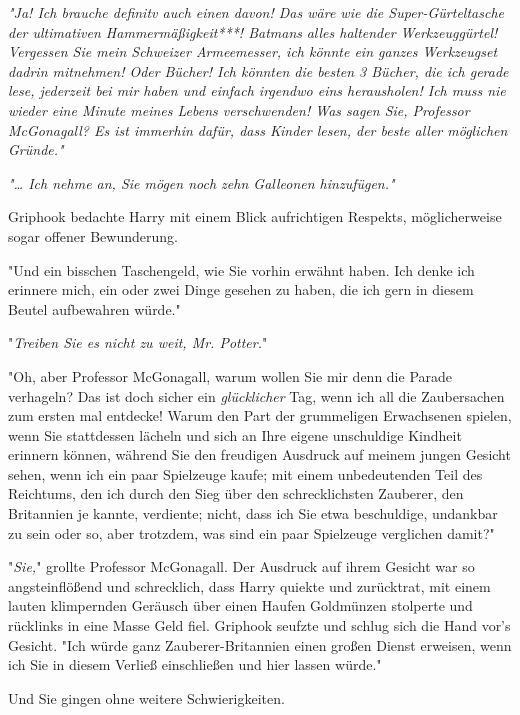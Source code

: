 {\emph{"Ja! Ich brauche definitv auch einen davon! Das wäre wie die Super-Gürteltasche der ultimativen Hammermäßigkeit***! Batmans} \emph{alles haltender Werkzeuggürtel! Vergessen Sie mein Schweizer Armeemesser, ich könnte ein ganzes Werkzeugset dadrin mitnehmen! Oder} \emph{\emph{Bücher}! Ich könnten die besten 3 Bücher, die ich gerade lese, jederzeit bei mir haben und einfach irgendwo eins herausholen! Ich muss nie wieder eine Minute meines Lebens verschwenden! Was sagen Sie, Professor McGonagall? Es ist immerhin dafür, dass Kinder lesen, der beste aller möglichen Gründe."}

\emph{"… Ich nehme an, Sie mögen noch zehn Galleonen hinzufügen."}

Griphook bedachte Harry mit einem Blick aufrichtigen Respekts, möglicherweise sogar offener Bewunderung.

"Und ein bisschen Taschengeld, wie Sie vorhin erwähnt haben. Ich denke ich erinnere mich, ein oder zwei Dinge gesehen zu haben, die ich gern in diesem Beutel aufbewahren würde."

"\emph{Treiben Sie es nicht zu weit, Mr. Potter.}"

"Oh, aber Professor McGonagall, warum wollen Sie mir denn die Parade verhageln? Das ist doch sicher ein \emph{glücklicher} Tag, wenn ich all die Zaubersachen zum ersten mal entdecke! Warum den Part der grummeligen Erwachsenen spielen, wenn Sie stattdessen lächeln und sich an Ihre eigene unschuldige Kindheit erinnern können, während Sie den freudigen Ausdruck auf meinem jungen Gesicht sehen, wenn ich ein paar Spielzeuge kaufe; mit einem unbedeutenden Teil des Reichtums, den ich durch den Sieg über den schrecklichsten Zauberer, den Britannien je kannte, verdiente; nicht, dass ich Sie etwa beschuldige, undankbar zu sein oder so, aber trotzdem, was sind ein paar Spielzeuge verglichen damit?"

"\emph{Sie,}" grollte Professor McGonagall. Der Ausdruck auf ihrem Gesicht war so angsteinflößend und schrecklich, dass Harry quiekte und zurücktrat, mit einem lauten klimpernden Geräusch über einen Haufen Goldmünzen stolperte und rücklinks in eine Masse Geld fiel. Griphook seufzte und schlug sich die Hand vor's Gesicht. "Ich würde ganz Zauberer-Britannien einen großen Dienst erweisen, wenn ich Sie in diesem Verließ einschließen und hier lassen würde."

Und Sie gingen ohne weitere Schwierigkeiten.

}
